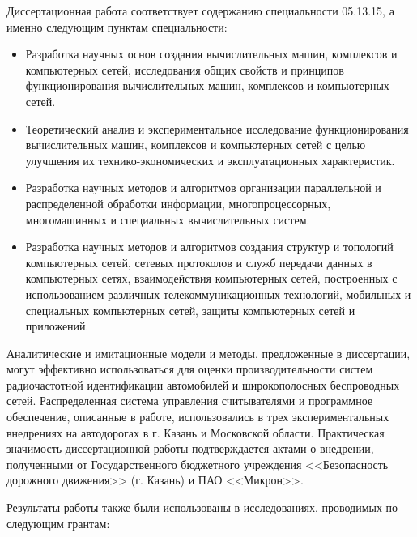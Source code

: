 {\speciality}
Диссертационная работа соответствует содержанию специальности 05.13.15, а именно следующим пунктам специальности:
\begin{itemize}
    \item Разработка научных основ создания вычислительных машин, комплексов и компьютерных сетей, исследования общих свойств и принципов функционирования вычислительных машин, комплексов и компьютерных сетей.
    \item Теоретический анализ и экспериментальное исследование функционирования вычислительных машин, комплексов и компьютерных сетей с целью улучшения их технико-экономических и эксплуатационных характеристик.
    \item Разработка научных методов и алгоритмов организации параллельной и распределенной обработки информации, многопроцессорных, многомашинных и специальных вычислительных систем.
    \item Разработка научных методов и алгоритмов создания структур и топологий компьютерных сетей, сетевых протоколов и служб передачи данных в компьютерных сетях, взаимодействия компьютерных сетей, построенных с использованием различных телекоммуникационных технологий, мобильных и специальных компьютерных сетей, защиты компьютерных сетей и приложений.
\end{itemize}

{\influence}
Аналитические и имитационные модели и методы, предложенные в диссертации, могут эффективно использоваться для оценки производительности систем радиочастотной идентификации автомобилей и широкополосных беспроводных сетей. Распределенная система управления считывателями и программное обеспечение, описанные в работе, использовались в трех экспериментальных внедрениях на автодорогах в г. Казань и Московской области. Практическая значимость диссертационной работы подтверждается актами о внедрении, полученными от Государственного бюджетного учреждения <<Безопасность дорожного движения>> (г. Казань) и ПАО <<Микрон>>.

Результаты работы также были использованы в исследованиях, проводимых по следующим грантам:

